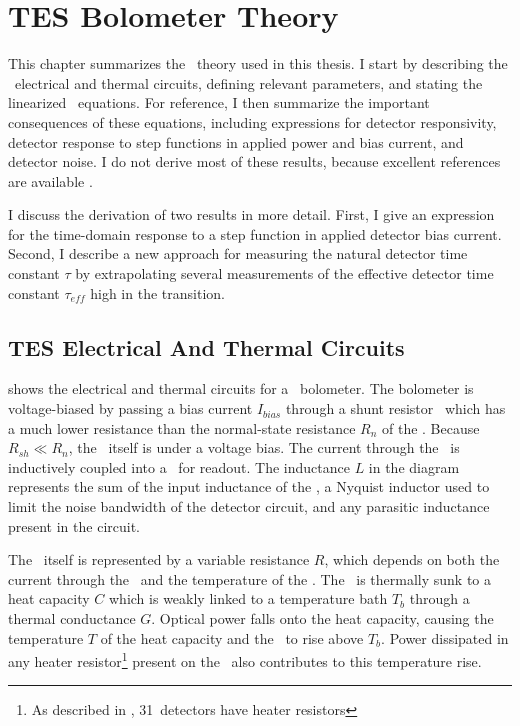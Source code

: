 \chapter{\textsc{TES} Bolometer Theory}\label{c:tes}

This chapter summarizes the \TES\ theory used in this thesis.
I start by describing the \TES\ electrical and thermal circuits, defining relevant parameters, and stating the linearized \TES\ equations.
For reference, I then summarize the important consequences of these equations, including expressions for detector responsivity, detector response to step functions in applied power and bias current, and detector noise.
I do not derive most of these results, because excellent references are available \cite{irwin_application_1995,irwin_transition-edge_2005, mather_bolometer_1982}.

I discuss the derivation of two results in more detail.
First, I give an expression for the time-domain response to a step function in applied detector bias current.
Second, I describe a new approach for measuring the natural detector time constant $\tau$ by extrapolating several measurements of the effective detector time constant $\tau_{eff}$ high in the transition. 

\section{\textsc{TES} Electrical And Thermal Circuits}

 shows the electrical and thermal circuits for a \TES\ bolometer.
The bolometer is voltage-biased by passing a bias current $I_{bias}$ through a shunt resistor \Rsh\ which has a much lower resistance than the normal-state resistance $R_n$ of the \TES.
Because $R_{sh} \ll R_n$, the \TES\ itself is under a voltage bias.
The current through the \TES\ is inductively coupled into a \SQUID\ for readout.
The inductance $L$ in the diagram represents the sum of the input inductance of the \SQUID, a Nyquist inductor used to limit the noise bandwidth of the detector circuit, and any parasitic inductance present in the circuit.

The \TES\ itself is represented by a variable resistance $R$, which depends on both the current through the \TES\ and the temperature of the \TES.
The \TES\ is thermally sunk to a heat capacity $C$ which is weakly linked to a temperature bath $T_b$ through a thermal conductance $G$.
Optical power falls onto the heat capacity, causing the temperature $T$ of the heat capacity and the \TES\ to rise above $T_b$.
Power dissipated in any heater resistor\footnote{As described in , 31~detectors have heater resistors} present on the \TES\ also contributes to this temperature rise.

